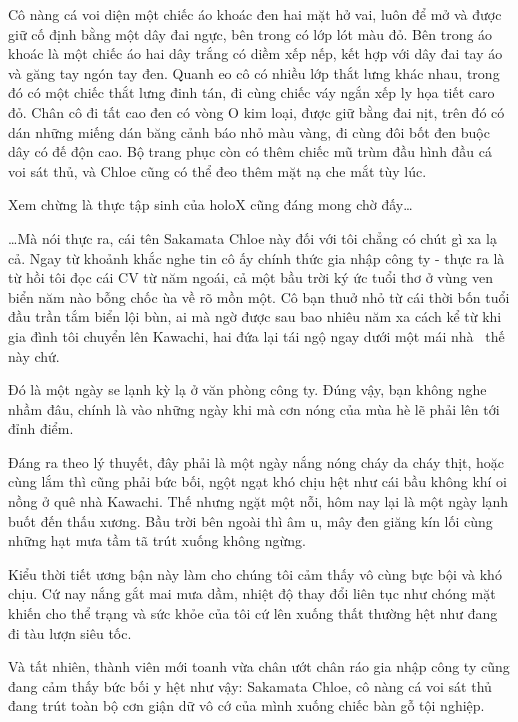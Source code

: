 \documentclass[../main.tex]{subfiles}
\begin{document}
Cô nàng cá voi diện một chiếc áo khoác đen hai mặt hở vai, luôn để mở và được giữ cố định bằng một dây đai ngực, bên trong có lớp lót màu đỏ. Bên trong áo khoác là một chiếc áo hai dây trắng có diềm xếp nếp, kết hợp với dây đai tay áo và găng tay ngón tay đen. Quanh eo cô có nhiều lớp thắt lưng khác nhau, trong đó có một chiếc thắt lưng đinh tán, đi cùng chiếc váy ngắn xếp ly họa tiết caro đỏ. Chân cô đi tất cao đen có vòng O kim loại, được giữ bằng đai nịt, trên đó có dán những miếng dán băng cảnh báo nhỏ màu vàng, đi cùng đôi bốt đen buộc dây có đế độn cao. Bộ trang phục còn có thêm chiếc mũ trùm đầu hình đầu cá voi sát thủ, và Chloe cũng có thể đeo thêm mặt nạ che mắt tùy lúc.

\chrint

Xem chừng là thực tập sinh của holoX cũng đáng mong chờ đấy\dots

\dots Mà nói thực ra, cái tên Sakamata Chloe này đối với tôi chẳng có chút gì xa lạ cả. Ngay từ khoảnh khắc nghe tin cô ấy chính thức gia nhập công ty - thực ra là từ hồi tôi đọc cái CV từ năm ngoái, cả một bầu trời ký ức tuổi thơ ở vùng ven biển năm nào bỗng chốc ùa về rõ mồn một. Cô bạn thuở nhỏ từ cái thời bốn tuổi đầu trần tắm biển lội bùn, ai mà ngờ được sau bao nhiêu năm xa cách kể từ khi gia đình tôi chuyển lên Kawachi, hai đứa lại tái ngộ ngay dưới một mái nhà \hll\ thế này chứ.

\il

Đó là một ngày se lạnh kỳ lạ ở văn phòng công ty. Đúng vậy, bạn không nghe nhầm đâu, chính là vào những ngày khi mà cơn nóng của mùa hè lẽ phải lên tới đỉnh điểm.

Đáng ra theo lý thuyết, đây phải là một ngày nắng nóng cháy da cháy thịt, hoặc cùng lắm thì cũng phải bức bối, ngột ngạt khó chịu hệt như cái bầu không khí oi nồng ở quê nhà Kawachi. Thế nhưng ngặt một nỗi, hôm nay lại là một ngày lạnh buốt đến thấu xương. Bầu trời bên ngoài thì âm u, mây đen giăng kín lối cùng những hạt mưa tầm tã trút xuống không ngừng.

Kiểu thời tiết ương bận này làm cho chúng tôi cảm thấy vô cùng bực bội và khó chịu. Cứ nay nắng gắt mai mưa dầm, nhiệt độ thay đổi liên tục như chóng mặt khiến cho thể trạng và sức khỏe của tôi cứ lên xuống thất thường hệt như đang đi tàu lượn siêu tốc.

Và tất nhiên, thành viên mới toanh vừa chân ướt chân ráo gia nhập công ty cũng đang cảm thấy bức bối y hệt như vậy: Sakamata Chloe, cô nàng cá voi sát thủ đang trút toàn bộ cơn giận dữ vô cớ của mình xuống chiếc bàn gỗ tội nghiệp.
\end{document}
